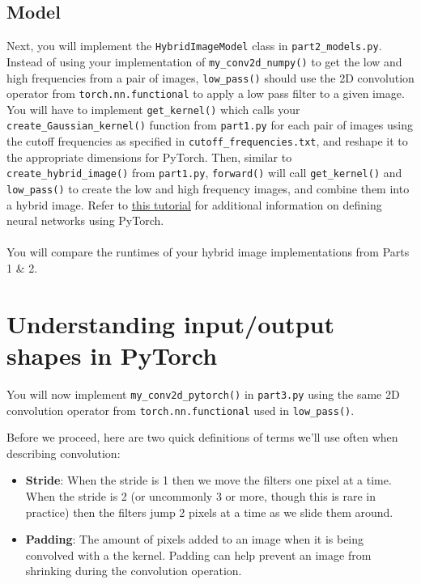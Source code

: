\documentclass{article}
\begin{document}
\subsection{Model}
Next, you will implement the \lstinline{HybridImageModel} class in \lstinline{part2_models.py}. Instead of using your implementation of \lstinline{my_conv2d_numpy()} to get the low and high frequencies from a pair of images, \lstinline{low_pass()} should use the 2D convolution operator from \lstinline{torch.nn.functional} to apply a low pass filter to a given image. You will have to implement \lstinline{get_kernel()} which calls your \lstinline{create_Gaussian_kernel()} function from \lstinline{part1.py} for each pair of images using the cutoff frequencies as specified in \lstinline{cutoff_frequencies.txt}, and reshape it to the appropriate dimensions for PyTorch. Then, similar to \lstinline{create_hybrid_image()} from \lstinline{part1.py}, \lstinline{forward()} will call \lstinline{get_kernel()} and \lstinline{low_pass()} to create the low and high frequency images, and combine them into a hybrid image. Refer to \href{https://pytorch.org/tutorials/beginner/blitz/neural_networks_tutorial.html}{this tutorial} for additional information on defining neural networks using PyTorch.
\\
\\
You will compare the runtimes of your hybrid image implementations from Parts 1 \& 2.


\section{Understanding input/output shapes in PyTorch}
You will now implement \lstinline{my_conv2d_pytorch()} in \lstinline{part3.py} using the same 2D convolution operator from \lstinline{torch.nn.functional} used in \lstinline{low_pass()}.

Before we proceed, here are two quick definitions of terms we'll use often when describing convolution:
\begin{itemize}
    \item \textbf{Stride}: When the stride is 1 then we move the filters one pixel at a time. When the stride is 2 (or uncommonly 3 or more, though this is rare in practice) then the filters jump 2 pixels at a time as we slide them around. 
    \item \textbf{Padding}: The amount of pixels added to an image when it is being convolved with a the kernel. Padding can help prevent an image from shrinking during the convolution operation.
\end{itemize}
\end{document}
